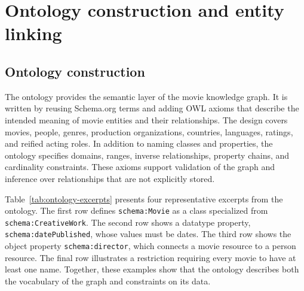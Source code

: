 \section{Ontology construction and entity linking}\label{sec:onto}

\subsection{Ontology construction}

The ontology provides the semantic layer of the movie knowledge graph. It is
written by reusing Schema.org terms and adding OWL axioms that describe the
intended meaning of movie entities and their relationships. The design covers
movies, people, genres, production organizations, countries, languages,
ratings, and reified acting roles. In addition to naming classes and
properties, the ontology specifies domains, ranges, inverse relationships,
property chains, and cardinality constraints. These axioms support validation
of the graph and inference over relationships that are not explicitly stored.

Table~\ref{tab:ontology-excerpts} presents four representative excerpts from
the ontology. The first row defines \texttt{schema:Movie} as a class
specialized from \texttt{schema:CreativeWork}. The second row shows a
datatype property, \texttt{schema:datePublished}, whose values must be
dates. The third row shows the object property
\texttt{schema:director}, which connects a movie resource to a person
resource. The final row illustrates a restriction requiring every movie to
have at least one name. Together, these examples show that the ontology
describes both the vocabulary of the graph and constraints on its data.

